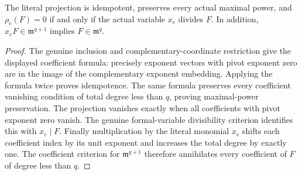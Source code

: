 \begin{theorem}
\label{hir:actual-exceptional-pivot-projection-kernel-powers}
\leanok
The literal projection is idempotent, preserves every actual maximal
power, and $\rho_e(F)=0$ if and only if the actual variable $x_e$
divides $F$. In addition, $x_eF\in\mathfrak m^{q+1}$ implies
$F\in\mathfrak m^q$.
\end{theorem}
\begin{proof}
The genuine inclusion and complementary-coordinate restriction give
the displayed coefficient formula: precisely exponent vectors with
pivot exponent zero are in the image of the complementary exponent
embedding. Applying the formula twice proves idempotence. The same
formula preserves every coefficient vanishing condition of total
degree less than $q$, proving maximal-power preservation.
The projection vanishes exactly when all coefficients with pivot
exponent zero vanish. The genuine formal-variable divisibility
criterion identifies this with $x_e\mid F$. Finally multiplication
by the literal monomial $x_e$ shifts each coefficient index by its
unit exponent and increases the total degree by exactly one. The
coefficient criterion for $\mathfrak m^{q+1}$ therefore annihilates
every coefficient of $F$ of degree less than $q$.
\end{proof}

